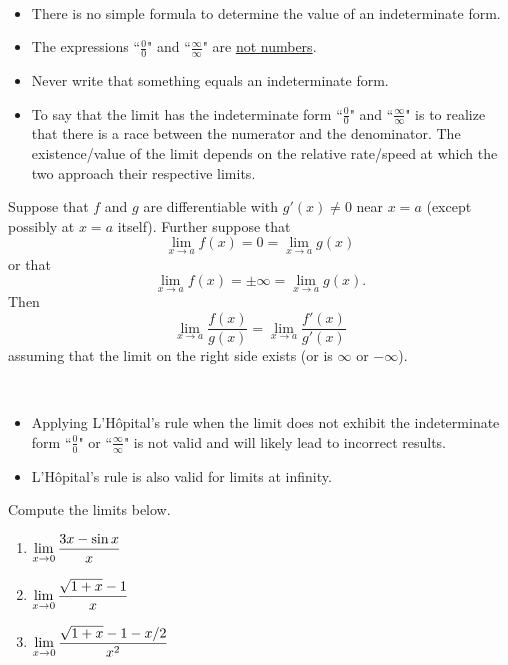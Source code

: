 \begin{remark}\,
\begin{itemize}
\item There is no simple formula to determine the value of an indeterminate form.
\item The expressions ``$\frac{0}{0}$" and ``$\frac{\infty}{\infty}$" are \underline{not numbers}.
\item Never write that something equals an indeterminate form.
\item To say that the limit has the indeterminate form ``$\frac{0}{0}$" and ``$\frac{\infty}{\infty}$" is to realize that there is a race between the numerator and the denominator.
The existence/value of the limit depends on the relative rate/speed at which the two approach their respective limits.
\end{itemize}
\end{remark}

\begin{theorem}
Suppose that $f$ and $g$ are differentiable with $g'(x)\ne 0$ near $x=a$ (except possibly at $x=a$ itself).
Further suppose that 
\begin{equation*}
\lim_{x\to a}f(x) = 0 = \lim_{x\to a}g(x)
\end{equation*}
or that
\begin{equation*}
\lim_{x\to a}f(x) = \pm\infty = \lim_{x\to a}g(x).
\end{equation*}
Then
\begin{equation*}
\lim_{x\to a}\frac{f(x)}{g(x)} = \lim_{x\to a}\frac{f'(x)}{g'(x)}
\end{equation*}
assuming that the limit on the right side exists (or is $\infty$ or $-\infty$).
\end{theorem}

\begin{remark}\,
\begin{itemize}
\item Applying L'H\^opital's rule when the limit does not exhibit the indeterminate form ``$\frac{0}{0}$" or ``$\frac{\infty}{\infty}$" is not valid and will likely lead to incorrect results.
\item L'H\^opital's rule is also valid for limits at infinity.
\end{itemize}
\end{remark}

\newpage

\begin{example}
Compute the limits below.
\begin{enumerate}
\item $\displaystyle\lim_{x\to 0}\frac{3x - \sin x}{x}$
\vfill
\item $\displaystyle\lim_{x\to 0}\frac{\sqrt{1+x}-1}{x}$
\vfill
\item $\displaystyle\lim_{x\to 0}\frac{\sqrt{1+x}-1-x/2}{x^2}$
\vfill
\end{enumerate}
\end{example}

